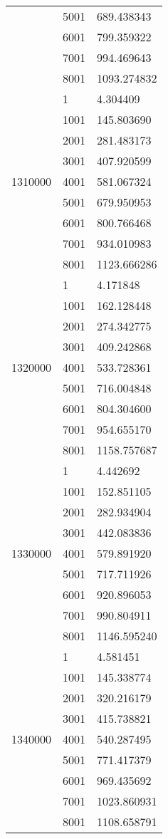 \begin{table}[htb!]
\begin{tabular}{lll}
 & 5001 & 689.438343 \\
 & 6001 & 799.359322 \\
 & 7001 & 994.469643 \\
 & 8001 & 1093.274832 \\
\multirow[c]{9}{*}{1310000} & 1 & 4.304409 \\
 & 1001 & 145.803690 \\
 & 2001 & 281.483173 \\
 & 3001 & 407.920599 \\
 & 4001 & 581.067324 \\
 & 5001 & 679.950953 \\
 & 6001 & 800.766468 \\
 & 7001 & 934.010983 \\
 & 8001 & 1123.666286 \\
\multirow[c]{9}{*}{1320000} & 1 & 4.171848 \\
 & 1001 & 162.128448 \\
 & 2001 & 274.342775 \\
 & 3001 & 409.242868 \\
 & 4001 & 533.728361 \\
 & 5001 & 716.004848 \\
 & 6001 & 804.304600 \\
 & 7001 & 954.655170 \\
 & 8001 & 1158.757687 \\
\multirow[c]{9}{*}{1330000} & 1 & 4.442692 \\
 & 1001 & 152.851105 \\
 & 2001 & 282.934904 \\
 & 3001 & 442.083836 \\
 & 4001 & 579.891920 \\
 & 5001 & 717.711926 \\
 & 6001 & 920.896053 \\
 & 7001 & 990.804911 \\
 & 8001 & 1146.595240 \\
\multirow[c]{9}{*}{1340000} & 1 & 4.581451 \\
 & 1001 & 145.338774 \\
 & 2001 & 320.216179 \\
 & 3001 & 415.738821 \\
 & 4001 & 540.287495 \\
 & 5001 & 771.417379 \\
 & 6001 & 969.435692 \\
 & 7001 & 1023.860931 \\
 & 8001 & 1108.658791 \\

\end{tabular}
\end{table}

